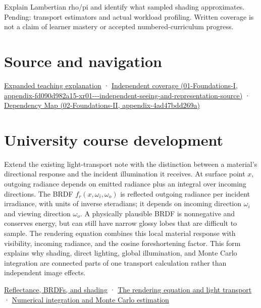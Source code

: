 Explain Lambertian rho/pi and identify what sampled shading approximates. Pending: transport estimators and actual workload profiling. Written coverage is not a claim of learner mastery or accepted numbered-curriculum progress.

\section{Source and navigation}\label{appendix-96da0b153b77-source-and-navigation}

\href{Continuous\%20Notes/University\%20-\%20Worlds,\%20Images\%20and\%20Inference\%20-\%20Graphics,\%20Vision\%20and\%20Photography\#Materials\%20turn\%20incoming\%20light\%20into\%20outgoing\%20light}{Expanded teaching explanation} · \href{../01-Foundations-I/main.pdf\#nameddest=appendix-fd090d982a15-xr01---independent-seeing-and-representation-source}{Independent coverage (01-Foundations-I, appendix-fd090d982a15-xr01-\/-\/-independent-seeing-and-representation-source)} · \href{../02-Foundations-II/main.pdf\#nameddest=appendix-4ad47bdd269a}{Dependency Map (02-Foundations-II, appendix-4ad47bdd269a)}

\section{University course development}\label{appendix-96da0b153b77-university-course-development}

Extend the existing light-transport note with the distinction between a material's directional response and the incident illumination it receives. At surface point \(x\), outgoing radiance depends on emitted radiance plus an integral over incoming directions. The BRDF \(f_r(x,\omega_i,\omega_o)\) is reflected outgoing radiance per incident irradiance, with units of inverse steradians; it depends on incoming direction \(\omega_i\) and viewing direction \(\omega_o\). A physically plausible BRDF is nonnegative and conserves energy, but can still have narrow glossy lobes that are difficult to sample. The rendering equation combines this local material response with visibility, incoming radiance, and the cosine foreshortening factor. This form explains why shading, direct lighting, global illumination, and Monte Carlo integration are connected parts of one transport calculation rather than independent image effects.

\href{Continuous\%20Notes/University\%20-\%20Worlds,\%20Images\%20and\%20Inference\%20-\%20Graphics,\%20Vision\%20and\%20Photography\#Reflectance,\%20BRDFs,\%20and\%20shading}{Reflectance, BRDFs, and shading} · \href{Continuous\%20Notes/University\%20-\%20Worlds,\%20Images\%20and\%20Inference\%20-\%20Graphics,\%20Vision\%20and\%20Photography\#The\%20rendering\%20equation\%20and\%20light\%20transport}{The rendering equation and light transport} · \href{Continuous\%20Notes/University\%20-\%20Worlds,\%20Images\%20and\%20Inference\%20-\%20Graphics,\%20Vision\%20and\%20Photography\#Numerical\%20integration\%20and\%20Monte\%20Carlo\%20estimation}{Numerical integration and Monte Carlo estimation}

